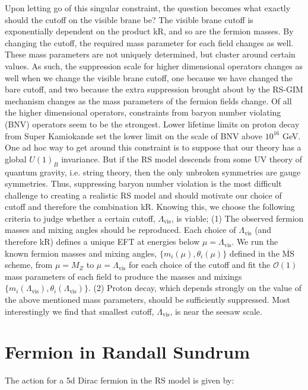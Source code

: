 \documentclass[aps,onecolumn,twoside,secnumarabic,balancelastpage,amsmath,amssymb,nofootinbib,hyperref=pdftex]{revtex4}
\begin{document}
Upon letting go of this singular constraint, the question becomes what exactly should the cutoff on the visible brane be? The visible brane cutoff is exponentially dependent on the product kR, and so are the fermion masses. By changing the cutoff, the required mass parameter for each field changes as well. These mass parameters are not uniquely determined, but cluster around certain values. As such, the suppression scale for higher dimensional operators changes as well when we change the visible brane cutoff, one because we have changed the bare cutoff, and two because the extra suppression brought about by the RS-GIM mechanism changes as the mass parameters of the fermion fields change. Of all the higher dimensional operators, constraints from baryon number violating (BNV)  operators seem to be the strongest. Lower lifetime limits on proton decay from Super Kamiokande set the lower limit on the scale of BNV above $10^{16}$ GeV. One ad hoc way to get around this constraint is to suppose that our theory has a global $U(1)_{B}$ invariance. But if the RS model descends from some UV theory of quantum gravity, i.e. string theory, then the only unbroken symmetries are gauge symmetries. Thus, suppressing baryon number violation is the most difficult challenge to creating a realistic RS model and should motivate our choice of cutoff and therefore the combination kR.
\vskip 0.12in
Knowing this, we choose the following criteria to judge whether a certain cutoff, $\Lambda_{\text{vis}}$, is viable; (1) The observed fermion masses and mixing angles should be reproduced. Each choice of $\Lambda_{\text{vis}}$ (and therefore kR) defines a unique EFT at energies below $\mu = \Lambda_{\text{vis}}$. We run the known fermion masses and mixing angles, $\{m_{i}(\mu),\theta_{i}(\mu)\}$ defined in the $\overline{{\text{MS}}}$ scheme, from $\mu = M_{Z}$ to $\mu = \Lambda_{\text{vis}}$ for each choice of the cutoff and fit the $\mathcal{O}(1)$ mass parameters of each field to produce the masses and mixings $\{m_{i}(\Lambda_{\text{vis}}),\theta_{i}(\Lambda_{\text{vis}})\}$. (2) Proton decay, which depends strongly on the value of the above mentioned mass parameters, should be sufficiently suppressed. Most interestingly we find that smallest cutoff, $\Lambda_{\text{vis}}$, is near the seesaw scale.

\section{Fermion in Randall Sundrum}

The action for a 5d Dirac fermion in the RS model is given by: 
\end{document}
